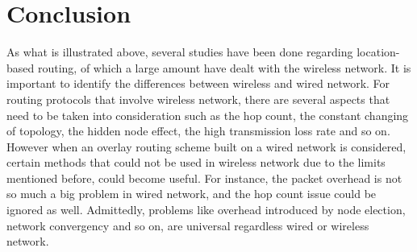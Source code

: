 \documentclass[conference]{IEEEtran}
\begin{document}

\section{Conclusion}
\label{conclusion}
As what is illustrated above, several studies have been done regarding location-based routing, of which a large amount have dealt with the wireless network. It is important to identify the differences between wireless and wired network. For routing protocols that involve wireless network, there are several aspects that need to be taken into consideration
such as the hop count, the constant changing of topology, the hidden node effect, the high transmission loss rate and so on. However when an overlay routing scheme built on a wired network is considered, certain methods that could not be used in wireless network due to the limits mentioned before, could become useful. For instance, the packet overhead is
not so much a big problem in wired network, and the hop count issue could be ignored as well. Admittedly, problems like overhead introduced by node election, network convergency and so on, are universal regardless wired or wireless network.




%
%
\end{document}
